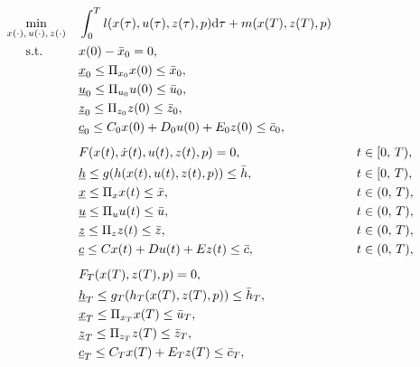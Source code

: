 \documentclass{article}
\begin{document}
\begin{equation}
\begin{aligned}
&\underset{\begin{subarray}{c}
    x(\cdot),\,u(\cdot), \, z(\cdot)
\end{subarray}}{\min}	    &&\int_0^T l(x(\tau), u(\tau), z(\tau), p)\mathrm{d}\tau + m(x(T), z(T), p)\\ 
                            &\,\,\,\quad \text{s.t.}    &&x(0) - \bar{x}_0 = 0, &&\\
                            & 						    &&\underline{x}_0 \leq \Pi_{x_0}x(0) \leq \bar{x}_0, && \\
                            & 						    &&\underline{u}_0 \leq \Pi_{u_0}u(0) \leq \bar{u}_0, && \\
                            & 						    &&\underline{z}_0 \leq \Pi_{z_0}z(0) \leq \bar{z}_0, && \\
                            & 						    &&\underline{c}_0 \leq C_0x(0) + D_0u(0) + E_0z(0)\leq \bar{c}_0, && \\
                            &                           &&                                                   && \\[-1em]  
                            & 						    &&F(x(t), \dot{x}(t), u(t), z(t), p) = 0, &&\quad t \in [0,\,T),\\
                            & 						    &&\underline{h} \leq g(h(x(t), u(t), z(t), p)) \leq \bar{h}, &&\quad t \in [0,\,T),\\
                            & 						    &&\underline{x} \leq \Pi_{x}x(t) \leq \bar{x}, &&\quad t \in (0,\,T),\\
                            & 						    &&\underline{u} \leq \Pi_{u}u(t) \leq \bar{u}, &&\quad t \in (0,\,T),\\
                            & 						    &&\underline{z} \leq \Pi_{z}z(t) \leq \bar{z}, && \quad t \in (0,\,T),\\
                            & 						    &&\underline{c} \leq Cx(t) + Du(t) + Ez(t)\leq \bar{c}, &&\quad t \in (0,\,T), \\
                            &                           &&                                                   && \\[-1em] 
                            & 						    &&F_T(x(T), z(T), p) = 0, &&\\
                            & 						    &&\underline{h}_T \leq g_T(h_T(x(T), z(T), p)) \leq \bar{h}_T, &&\\
                            & 						    &&\underline{x}_T \leq \Pi_{x_T}x(T) \leq \bar{u}_{T}, &&\\
                            & 						    &&\underline{z}_T \leq \Pi_{z_T}z(T) \leq \bar{z}_T, && \\
                            & 						    &&\underline{c}_T \leq C_Tx(T) + E_Tz(T)\leq \bar{c}_T, &&\\
\end{aligned}
\end{equation}
\end{document}
